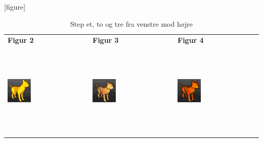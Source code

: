 [figure]
\renewcommand{\therownumber}{\arabic{rownumber}} %
\setcounter{rownumber}{0} %
\begin{table}[h!]
     \begin{center}
     \begin{tabular}{ | l | l | l | }
     \hline
      \textbf{Figur 2} & \textbf{Figur 3} & \textbf{Figur 4}\\ %
      
{rownumber}
    \label{row1} \includegraphics[width=0.3\textwidth,height=45mm]{Files/CelShading/silhouette4.pdf}
  
{rownumber} %
     &
    \label{row2} \includegraphics[width=0.3\textwidth, height=45mm]{Files/CelShading/silhouette5.pdf}
  
{rownumber}    
     &
     \label{row3} \includegraphics[width=0.3\textwidth, height=45mm]{Files/CelShading/silhouette6.jpg}
    
   \\ \hline
     
   \end{tabular}
   \caption{Step et, to og tre fra venstre mod højre
   \label{figtbl:modulation}}
   \end{center}
   \end{table}